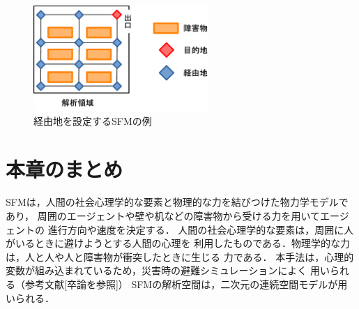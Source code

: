 \begin{figure}[hbtp]
 \begin{center}
  \includegraphics[height=4cm,clip]{figure/keiyuti_ex2.eps}
  \caption{経由地を設定するSFMの例}
  \label{fig:jitumondai_ex}
 \end{center}
\end{figure}


\section{本章のまとめ}

SFMは，人間の社会心理学的な要素と物理的な力を結びつけた物力学モデルであり，
周囲のエージェントや壁や机などの障害物から受ける力を用いてエージェントの
進行方向や速度を決定する．
人間の社会心理学的な要素は，周囲に人がいるときに避けようとする人間の心理を
利用したものである．物理学的な力は，人と人や人と障害物が衝突したときに生じる
力である．
本手法は，心理的変数が組み込まれているため，災害時の避難シミュレーションによく
用いられる（参考文献[卒論を参照]）
SFMの解析空間は，二次元の連続空間モデルが用いられる．



